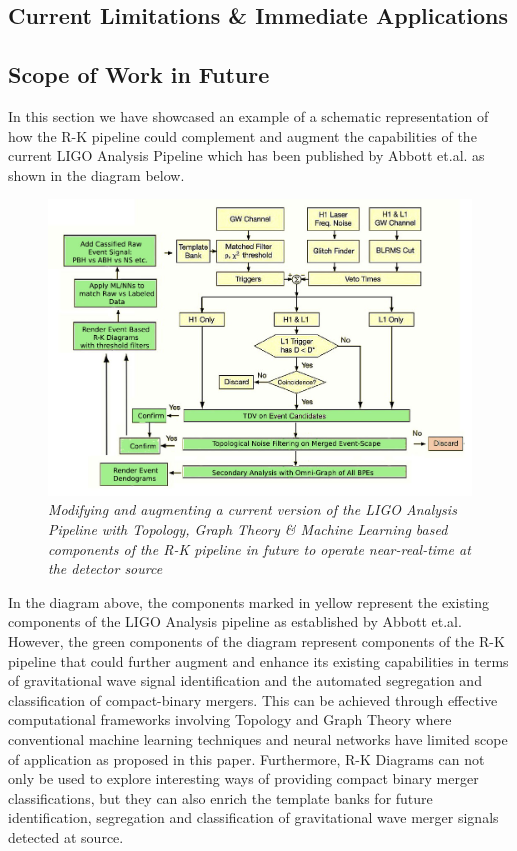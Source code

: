 \subsection{Current Limitations \& Immediate Applications}

\subsection{Scope of Work in Future}

In this section we have showcased an example of a schematic representation of how the R-K pipeline could complement and augment the capabilities of  the current LIGO Analysis Pipeline which has been published by Abbott et.al. \cite{00.6_LIGOAnalysisPipeline} as shown in the diagram below.

\begin{figure}[H]
	\centering
	\includegraphics[width=1.0\linewidth]{images/Modified-TDA-LIGO-Analysis-Pipeline.jpg}
	\caption{\textit{Modifying and augmenting a current version of the LIGO Analysis Pipeline with
			Topology, Graph Theory \& Machine Learning based components of the R-K pipeline in future to operate near-real-time at the detector source}}
	\label{fig:odified-TDA-LIGO-Analysis-Pipeline}
\end{figure}

In the diagram above, the components marked in yellow represent the existing components of the LIGO Analysis pipeline  as established by Abbott et.al. However, the green components of the diagram represent components of the R-K pipeline that could further augment and enhance its existing capabilities in terms of gravitational wave signal identification and the automated segregation and classification of compact-binary mergers. This can be achieved through effective computational frameworks involving Topology and Graph Theory where conventional machine learning techniques and neural networks have limited scope of application as proposed in this paper. Furthermore, R-K Diagrams can not only be used to explore  interesting ways of providing compact binary merger classifications, but they can also enrich the template banks for future identification, segregation and classification of gravitational wave merger signals detected at source.

